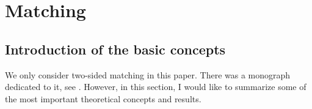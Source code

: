
\chapter{Matching}  %

\label{Chapter4} %




\section{Introduction of the basic concepts}




 
 
We only consider two-sided matching in this paper. There was a monograph dedicated to it, see \parencite{Roth1990}. However,  in this section, I would like to summarize some of the most important theoretical concepts and results. 

